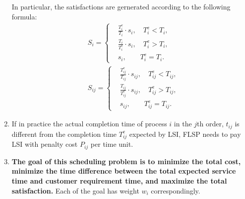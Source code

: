\documentclass{llncs}
\begin{document}
\begin{enumerate}
    In particular, the satisfactions are gernerated according to the following formula:
    \begin{align*}
        &S_{i}=\left\{
        \begin{matrix}
            &\frac{T_{i}^e}{T_{i}}\cdot s_{i}, \quad T_{i}^e<T_{i},\\
            &\frac{T_{i}}{T_{i}^e}\cdot s_{i}, \quad T_{i}^e>T_{i},\\
            &s_{i},\qquad T_{i}^e=T_{i}.
        \end{matrix}    
        \right.\\
        &S_{ij}=\left\{
        \begin{matrix}
            &\frac{T_{ij}^e}{T_{ij}}\cdot s_{ij}, \quad T_{ij}^e<T_{ij},\\
            &\frac{T_{ij}}{T_{ij}^e}\cdot s_{ij}, \quad T_{ij}^e>T_{ij},\\
            &s_{ij},\qquad T_{ij}^e=T_{ij}.
        \end{matrix}    
        \right.
    \end{align*}
     
    \item If in practice the actual completion time of process $i$ in the $j$th order, $t_{ij}$ is different from the completion time $T_{ij}^e$ expected by  LSI, FLSP needs to pay LSI with penalty cost $P_{ij}$ per time unit.
    \item \textbf{The goal of this scheduling problem is to minimize the total cost, minimize the time difference between the total expected service time and customer requirement time, and maximize the total satisfaction.} Each of the goal has weight $w_i$ correspondingly.
\end{enumerate}
\end{document}
